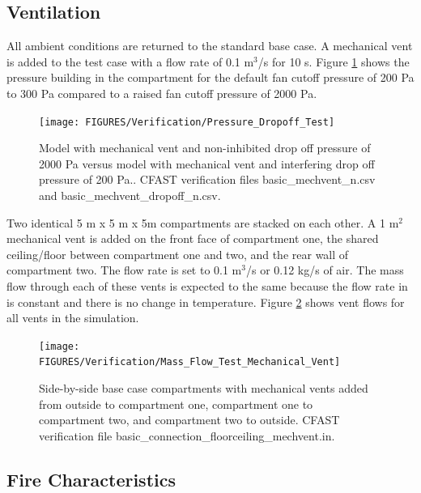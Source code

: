 \subsection{Ventilation}

All ambient conditions are returned to the standard base case.  A mechanical vent is added to the test case with a flow rate of 0.1 m$^3$/s for 10 s. Figure \ref{fig:Mechanical_Vent_Cutoff} shows the pressure building in the compartment for the default fan cutoff pressure of 200 Pa to 300 Pa compared to a raised fan cutoff pressure of 2000 Pa.

\begin{figure}
\begin{center}
\texttt{[image: FIGURES/Verification/Pressure\_Dropoff\_Test]}
\caption{Model with mechanical vent and non-inhibited drop off pressure of 2000 Pa versus model with mechanical vent and interfering drop off pressure of 200 Pa..  CFAST verification files basic\_mechvent\_n.csv and basic\_mechvent\_dropoff\_n.csv.}
\label{fig:Mechanical_Vent_Cutoff}
\end{center}
\end{figure}

Two identical 5 m x 5 m x 5m compartments are stacked on each other.  A 1 m$^2$ mechanical vent is added on the front face of compartment one, the shared ceiling/floor between compartment one and two, and the rear wall of compartment two.  The flow rate is set to 0.1 m$^3$/s or 0.12 kg/s of air.  The mass flow through each of these vents is expected to the same because the flow rate in is constant and there is no change in temperature.   Figure \ref{fig:Mechanical_Flow_Two_Compartments} shows vent flows for all vents in the simulation.

\begin{figure}
\begin{center}
\texttt{[image: FIGURES/Verification/Mass\_Flow\_Test\_Mechanical\_Vent]}
\caption{Side-by-side base case compartments with mechanical vents added from outside to compartment one, compartment one to compartment two, and compartment two to outside.  CFAST verification file basic\_connection\_floorceiling\_mechvent.in.}
\label{fig:Mechanical_Flow_Two_Compartments}
\end{center}
\end{figure}

\subsection{Fire Characteristics}

